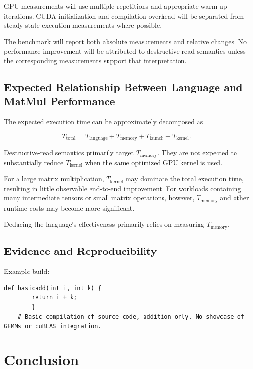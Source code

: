\documentclass[a4paper]{article}
\begin{document}
	GPU measurements will use multiple repetitions and appropriate warm-up iterations. CUDA \cite{} initialization and compilation overhead will be separated from steady-state execution measurements where possible.
	
	The benchmark will report both absolute measurements and relative changes. No performance improvement will be attributed to destructive-read semantics unless the corresponding measurements support that interpretation.
	
	
	
	\subsection{Expected Relationship Between Language and MatMul Performance}
	
	The expected execution time can be approximately decomposed as
	
	\begin{equation}
		T_{\mathrm{total}} =
		T_{\mathrm{language}} +
		T_{\mathrm{memory}} +
		T_{\mathrm{launch}} +
		T_{\mathrm{kernel}}.
	\end{equation}
	
	Destructive-read semantics primarily target $T_{\mathrm{memory}}$. They are not expected to substantially reduce $T_{\mathrm{kernel}}$ when the same optimized GPU kernel is used.
	
	For a large matrix multiplication, $T_{\mathrm{kernel}}$ may dominate the total execution time, resulting in little observable end-to-end improvement. For workloads containing many intermediate tensors or small matrix operations, however, $T_{\mathrm{memory}}$ and other runtime costs may become more significant. 

	Deducing the language's effectiveness primarily relies on measuring $T_{\mathrm{memory}}$.
	
	
	
	
	\subsection{Evidence and Reproducibility}
	\label{sec:evidence}
	
	Example build: 
	\begin{lstlisting}[caption = Example compilation]
	def basicadd(int i, int k) {
		return i + k;
		}
	# Basic compilation of source code, addition only. No showcase of GEMMs or cuBLAS integration.
	\end{lstlisting}
	\section{Conclusion}
\end{document}
